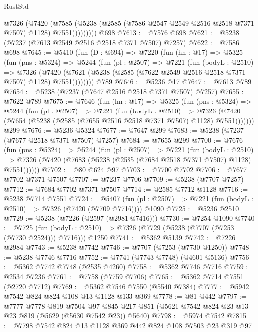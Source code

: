 \begin{lexlean}{RustStd}
\begin{coremodule}
              @7326
                (@7420
                  (@7585
                    (@5238 (@2585 (@7586 @2547 @2549 @2516 @2518 @7371 @7507) @1128) @7551)))))))))
    @698
@7613 := @7576 @698
@7621 := @5238 (@7237 (@7613 @2549 @2516 @2518 @7371 @7507) @7257)
@7622 := @7586 @698
@7645 := @5410
    (fun (D : @694) =>
    @7220
      (fun (hn : @17) =>
      @5325
        (fun (pns : @5324) =>
        @5244
          (fun (pl : @2507) =>
          @7221
            (fun (bodyL : @2510) =>
            @7326
              (@7420 (@7621 (@5238 (@2585 (@7622 @2549 @2516 @2518 @7371 @7507) @1128) @7551))))))))
    @789
@7646 := @5236 @17
@7647 := @7613 @789
@7654 := @5238 (@7237 (@7647 @2516 @2518 @7371 @7507) @7257)
@7655 := @7622 @789
@7675 := @7646
    (fun (hn : @17) =>
    @5325
      (fun (pns : @5324) =>
      @5244
        (fun (pl : @2507) =>
        @7221
          (fun (bodyL : @2510) =>
          @7326 (@7420 (@7654 (@5238 (@2585 (@7655 @2516 @2518 @7371 @7507) @1128) @7551)))))))
    @299
@7676 := @5236 @5324
@7677 := @7647 @299
@7683 := @5238 (@7237 (@7677 @2518 @7371 @7507) @7257)
@7684 := @7655 @299
@7700 := @7676
    (fun (pns : @5324) =>
    @5244
      (fun (pl : @2507) =>
      @7221
        (fun (bodyL : @2510) =>
        @7326 (@7420 (@7683 (@5238 (@2585 (@7684 @2518 @7371 @7507) @1128) @7551))))))
@7702 := @80 @624 @97
@7703 := @7700 @7702
@7706 := @7677 @7702 @7371 @7507
@7707 := @7237 @7706
@7709 := @5238 (@7707 @7257)
@7712 := @7684 @7702 @7371 @7507
@7714 := @2585 @7712 @1128
@7716 := @5238 @7714 @7551
@7724 := @5407
    (fun (pl : @2507) => @7221 (fun (bodyL : @2510) => @7326 (@7420 (@7709 @7716))))
    @1090
@7725 := @5236 @2510
@7729 := @5238 (@7226 (@2597 (@2981 @7416)))
@7730 := @7254 @1090
@7740 := @7725
    (fun (bodyL : @2510) => @7326 (@7729 (@5238 (@7707 (@7253 (@7730 @2524))) @7716)))
    @1250
@7741 := @5362 @5139
@7742 := @7226 @2984
@7743 := @5238 @7742
@7746 := @7707 (@7253 (@7730 @1250))
@7748 := @5238 @7746 @7716
@7752 := @7741 (@7743 @7748) (@4601 @5136)
@7756 := @5362 @7742 @7748 (@2535 @4260)
@7758 := @5362 @7746 @7716
@7759 := @2534 @7236
@7761 := @7758 (@7759 @7706)
@7765 := @5362 @7714 @7551 (@2720 @7712)
@7769 := @5362 @7546 @7550 (@5540 @7384)
@7777 := @5942 @7542 @824 @824 @108 @13 @1128 @133 @369
@7778 := @81 @442
@7797 := @7777
    @7778
    @819
    @7504
    @97
    @845
    @217
    @851
    (@5621 @7542 @824 @23 @13 @23 @819 (@5629 (@5630 @7542 @23)) @5640)
@7798 := @5974 @7542
@7815 := @7798
    @7542
    @824
    @13
    @1128
    @369
    @442
    @824
    @108
    @7503
    @23
    @319
    @97

\end{coremodule}
\end{lexlean}
